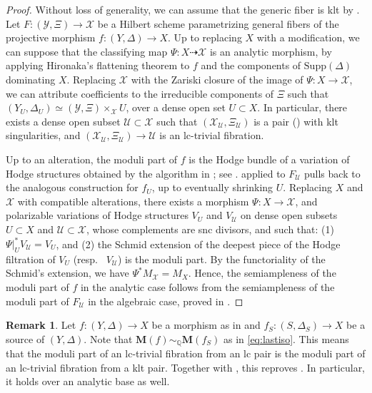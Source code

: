 \documentclass{amsart}
\theoremstyle{definition}
\newtheorem{remark}[theorem]{Remark}
\theoremstyle{remark}
\def\bQ{\mathbb{Q}}
\def\cU{\mathcal{U}}
\def\cX{\mathcal{X}}
\newcommand\bfM{{\bf M}}
\def\bfM{\mathbf{M}}
\numberwithin{equation}{section}
\begin{document}
\begin{proof}
Without loss of generality, we can assume that the generic fiber is klt by . 
Let $F \colon (\mathcal{Y},\Xi) \to \mathcal{X}$ be a Hilbert scheme parametrizing general fibers of the projective morphism $f \colon (Y, \Delta) \to X$. Up to replacing $X$ with a modification, we can suppose that the classifying map $\Psi \colon X \dashrightarrow \mathcal{X}$ is an analytic morphism, by applying Hironaka's flattening theorem \cite[Cor.~1]{Hir75} to $f$ and the components of $\mathrm{Supp}(\Delta)$ dominating $X$. Replacing $\mathcal{X}$ with the Zariski closure of the image of $\Psi \colon X \to \mathcal{X}$, we can attribute coefficients to the irreducible components of $\Xi$ such that $(Y_{U}, \Delta_U) \simeq (\mathcal{Y},\Xi) \times_{\mathcal{X}} U$, over a dense open set $U \subset X$. In particular, there exists a dense open subset $\mathcal{U} \subset \mathcal{X}$ such that  $(\mathcal{X}_{\mathcal{U}},\Xi_{\mathcal{U}})$ is a pair (\cite[Prop.~2.4]{HX15}) with klt singularities, and $(\mathcal{X}_{\mathcal{U}},\Xi_{\mathcal{U}}) \to \mathcal{U}$ is an lc-trivial fibration. 

 Up to an alteration, the moduli part of $f$ is the Hodge bundle of a variation of Hodge structures obtained by the algorithm in ; see .
 applied to $F_{\mathcal{U}}$ pulls back to the analogous construction for $f_U$, up to eventually shrinking $U$. Replacing $X$ and $\cX$ with compatible alterations, there exists a morphism $\Psi \colon X \to \cX$, and polarizable variations of Hodge structures $V_{U}$ and $V_{\cU}$ on dense open subsets $U \subset X$ and $\cU \subset \cX$, whose complements are snc divisors, and such that: (1) $\Psi|_{U}^* V_{\cU} = V_{U}$, and (2) the Schmid extension of the deepest piece of the Hodge filtration of $V_{U}$ (resp.~ $V_{\cU}$) is the moduli part. 
By the functoriality of the Schmid's extension, we have $\Psi^* M_{\cX} = M_{X}$. Hence, the semiampleness of the moduli part of $f$ in the analytic case follows from the semiampleness of the moduli part of $F_{\mathcal{U}}$ in the algebraic case, proved in . 
\end{proof}
\begin{remark}\label{rem:FG}
    Let $f \colon (Y, \Delta) \to X$ be a morphism as in  and $f_S \colon (S, \Delta_S) \to X$ be a source of $(Y, \Delta)$. Note that 
    $\bfM(f) \sim_{\bQ} \bfM(f_S)$ as in \eqref{eq:lastiso}. This means that the moduli part of an lc-trivial fibration from an lc pair is the moduli part of an lc-trivial fibration from a klt pair.
    Together with , this reproves  \cite[Thm.~1.1]{FG14}. In particular, it holds over an analytic base as well.
\end{remark}
\end{document}
